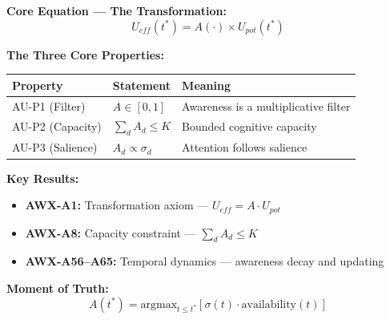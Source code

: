 
\begin{tcolorbox}[colback=yellow!10!white, colframe=yellow!75!black,
    title=\textbf{Quick Reference}]

\textbf{Core Equation --- The Transformation:}
\begin{equation}
\boxed{U_{eff}(t^*) = A(\cdot) \times U_{pot}(t^*)}
\label{eq:AU-core}
\end{equation}

\textbf{The Three Core Properties:}
\begin{center}
\small
\begin{tabular}{@{}lll@{}}
\toprule
\textbf{Property} & \textbf{Statement} & \textbf{Meaning} \\
\midrule
AU-P1 (Filter) & $A \in [0,1]$ & Awareness is a multiplicative filter \\
AU-P2 (Capacity) & $\sum_d A_d \leq K$ & Bounded cognitive capacity \\
AU-P3 (Salience) & $A_d \propto \sigma_d$ & Attention follows salience \\
\bottomrule
\end{tabular}
\end{center}

\textbf{Key Results:}
\begin{itemize}[nosep]
    \item \textbf{AWX-A1:} Transformation axiom --- $U_{eff} = A \cdot U_{pot}$
    \item \textbf{AWX-A8:} Capacity constraint --- $\sum_d A_d \leq K$
    \item \textbf{AWX-A56--A65:} Temporal dynamics --- awareness decay and updating
\end{itemize}

\textbf{Moment of Truth:}
\begin{equation}
A(t^*) = \text{argmax}_{t \leq t^*} \left[ \sigma(t) \cdot \text{availability}(t) \right]
\end{equation}

\end{tcolorbox}


